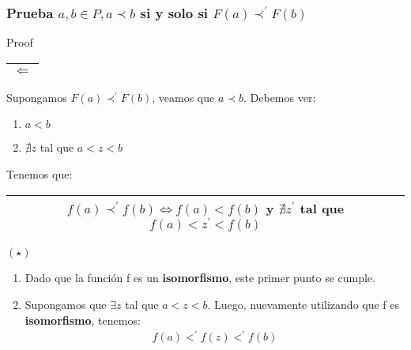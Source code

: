 \begin{frame}
	\frametitle{Prueba $a, b \in P, a \prec b$ si y solo si $F(a) \prec^{\prime} F(b)$}

	\begin{block}{Proof}
		\PN \begin{tabular}{|c|} \hline $\Leftarrow$ \\\hline \end{tabular} Supongamos $F(a) \prec^{\prime} F(b)$, veamos
		que $a \prec b$. Debemos ver:
			\begin{enumerate}
				\item $a < b$
				\item $\nexists z$ tal que $a < z < b$
			\end{enumerate}

		\vspace{2mm}
	  \PN Tenemos que:
		\begin{center}
			\begin{tabular}{|c|}
				\hline $f(a) \prec^{\prime} f(b) \Leftrightarrow f(a) < f(b)$ y $\nexists z^{\prime}$ tal que $f(a) <
				z^{\prime} < f(b)$ \\\hline
			\end{tabular} $(\star)$
		\end{center}

		\begin{enumerate}
	  	\item Dado que la función f es un \textbf{isomorfismo}, este primer punto se cumple.
			\item Supongamos que $\exists z$ tal que $a < z < b$. Luego, nuevamente utilizando que f es \textbf{isomorfismo},
			tenemos:
			\begin{eqnarray*}
				f(a) <^{\prime} f(z) <^{\prime} f(b)
			\end{eqnarray*}
		\end{enumerate}
	\end{block}
\end{frame}

